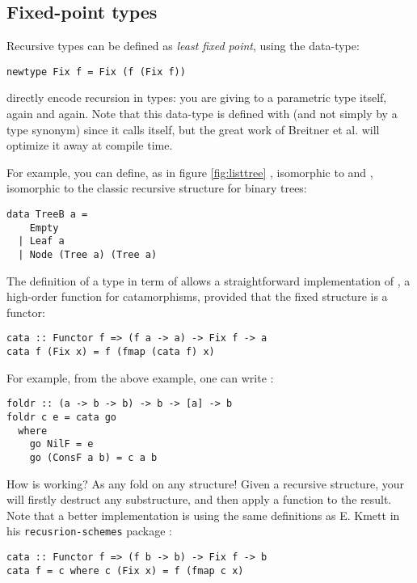 \subsection{Fixed-point types}
\label{subsec:defi}
Recursive types can be defined as \emph{least fixed point}, using the  data-type:
\begin{verbatim}
newtype Fix f = Fix (f (Fix f))
\end{verbatim}
 directly encode recursion in types: you are giving to a parametric type itself, again and again. Note that this data-type is defined with  (and not simply by a type synonym) since it calls itself, but the great work of Breitner et al. \cite{Breitner:2014:SZC:2692915.2628141} will optimize it away at compile time.

For example, you can define, as in figure \ref{fig:listtree}
, isomorphic to \minline{[a]} and , isomorphic to the classic recursive structure for binary trees:
\begin{verbatim}
data TreeB a = 
    Empty 
  | Leaf a
  | Node (Tree a) (Tree a)
\end{verbatim}

The definition of a type in term of  allows a straightforward implementation of , a high-order function for catamorphisms, provided that the fixed structure is a functor:

\begin{verbatim}
cata :: Functor f => (f a -> a) -> Fix f -> a
cata f (Fix x) = f (fmap (cata f) x)
\end{verbatim}
For example,  from the above example, one can write :
\begin{verbatim}
foldr :: (a -> b -> b) -> b -> [a] -> b
foldr c e = cata go
  where
    go NilF = e
    go (ConsF a b) = c a b
\end{verbatim}

How  is working? As any fold on any structure! Given a recursive structure, your will firstly destruct any substructure, and then apply a function to the result. Note that a better implementation is using the same definitions as E. Kmett in his \verb|recusrion-schemes| package \cite{ekmett:eschems}:

\begin{verbatim}
cata :: Functor f => (f b -> b) -> Fix f -> b
cata f = c where c (Fix x) = f (fmap c x)
\end{verbatim}

